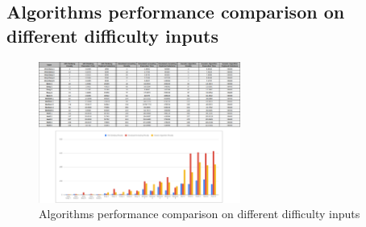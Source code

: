 \documentclass[conference]{IEEEtran}
\begin{document}
\subsection{Algorithms performance comparison on different difficulty inputs}

\begin{figure}[H]
    \centerline{\includegraphics[width=250px]{comparison.png}}
    \caption{Algorithms performance comparison on different difficulty inputs}
\end{figure}
\end{document}
